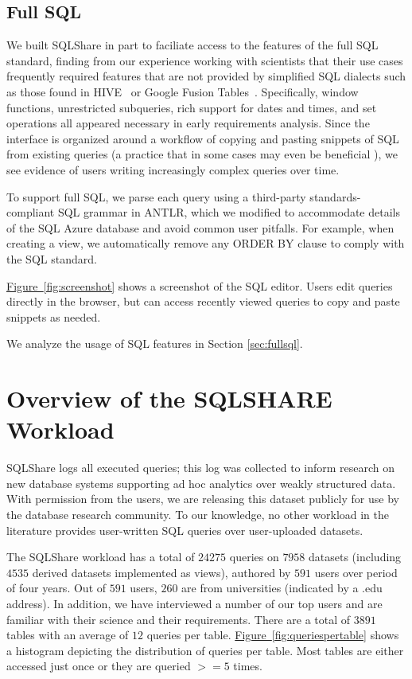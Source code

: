 \documentclass{sig-alternate}
\newcommand{\note}[2]{{\color{#1} {#2}}}
\newcommand{\reviewmeta}[1]{\note{black}{#1}}
\newcommand{\figref}[1]{\hyperref[#1]{Figure~\ref*{#1}}}
\newcommand{\sqlshare}{SQLShare}
\newcommand{\SQLSHARE}{SQLSHARE}
\begin{document}
\subsection{Full SQL}
\reviewmeta{We built \sqlshare{} in part to faciliate access to the features of the full SQL standard, finding from our experience working with scientists that their use cases frequently required features that are not provided by simplified SQL dialects such as those found in HIVE~\cite{hivesql} or Google Fusion Tables~\cite{gonzalez2010google}.
Specifically, window functions, unrestricted subqueries, rich support for dates and times, and set operations all appeared necessary in early requirements analysis. Since the interface is organized around a workflow of copying and pasting snippets of SQL from existing queries (a practice that in some cases may even be beneficial \cite{cloneuse} \cite{kim2005empirical}), we see evidence of users writing increasingly complex queries over time.

To support full SQL, we parse each query using a third-party standards-compliant SQL grammar in ANTLR, which we modified to accommodate details of the SQL Azure database and avoid common user pitfalls.  For example, when creating a view, we automatically remove any ORDER BY clause to comply with the SQL standard.

\figref{fig:screenshot} shows a screenshot of the SQL editor.  Users edit queries directly in the browser, but can access recently viewed queries to copy and paste snippets as needed.} We analyze the usage of SQL features in Section \ref{sec:fullsql}.


\section{Overview of the \SQLSHARE{}\\Workload}
\sqlshare{} logs all executed queries; this log was collected to inform research on new database systems supporting ad hoc analytics over weakly structured data.  With permission from the users, we are releasing this dataset publicly for use by the database research community.
To our knowledge, no other workload in the literature provides user-written SQL queries over user-uploaded datasets.

The \sqlshare{} workload has a total of $24275$ queries on $7958$ datasets (including $4535$ derived datasets implemented as views), authored by $591$ users over period of four years. \reviewmeta{Out of $591$ users, $260$ are from universities (indicated by a .edu address). In addition, we have interviewed a number of our top users and are familiar with their science and their requirements.} There are a total of $3891$ tables with an average of $12$ queries per table. 
\figref{fig:queriespertable} shows a histogram depicting the distribution of queries per table. Most tables are either accessed just once or they are queried $>=5$ times.
\end{document}
